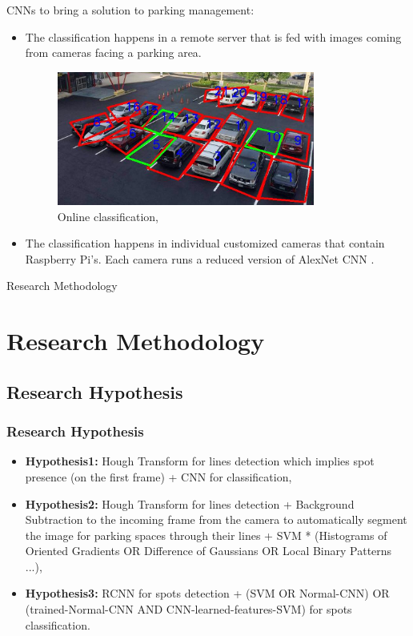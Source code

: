 \documentclass{beamer}
\begin{document}
\begin{frame}[allowframebreaks]
CNNs to bring a solution to parking management:

\begin{itemize}
	\item The classification happens in a remote server that is fed with images coming from cameras facing a parking area. 
	\begin{figure}[h!]
		\centering
		\includegraphics[width=0.8\textwidth]{Pictures/stall}
		\caption{Online classification, \cite{7845408}}
	\end{figure} 
	\item The classification happens in individual customized cameras that contain Raspberry Pi's. Each camera runs a reduced version of AlexNet CNN \cite{Amato2017327}. 
\end{itemize}


\end{frame}

\begin{frame}
\Huge Research Methodology
\end{frame}

\section{Research Methodology}

\subsection{Research Hypothesis}

\begin{frame}
\frametitle{Research Hypothesis}
\begin{itemize}
	\item \textbf{Hypothesis1: }Hough Transform for lines detection which implies spot presence (on the first frame) + CNN for classification,
	\item \textbf{Hypothesis2: }Hough Transform for lines detection + Background Subtraction to the incoming frame from the camera to automatically segment the image for parking spaces through their lines + SVM * (Histograms of Oriented Gradients OR  Difference of Gaussians OR Local Binary Patterns ...),
	\item \textbf{Hypothesis3: } RCNN for spots detection + (SVM OR Normal-CNN) OR (trained-Normal-CNN AND CNN-learned-features-SVM) for spots classification.
\end{itemize}

\end{frame}
\end{document}
